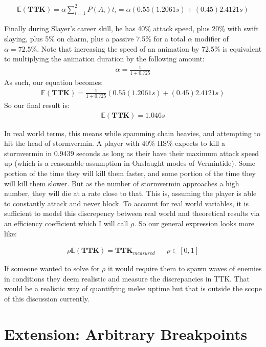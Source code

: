 \documentclass{article}
\begin{document}
\begin{align*}
\mathbb{E}(\mathbf{TTK}) = \alpha \sum_{i=1}^{2} P(A_i) t_i = \alpha (0.55 (1.2061 s) + (0.45) 2.4121 s)
\end{align*}

Finally during Slayer's career skill, he has 40\% attack speed, plus 20\% with swift slaying, plus 5\% on charm, plus a passive 7.5\% for a total $\alpha$ modifier of $\alpha=72.5\%$. Note that increasing the speed of an animation by 72.5\% is equivalent to multiplying the animation duration by the following amount:
\begin{align*}
\alpha = \frac{1}{1+0.725}
\end{align*}
As such, our equation becomes:
\begin{align*}
\mathbb{E}(\mathbf{TTK}) = \tfrac{1}{1+0.725} (0.55 (1.2061 s) + (0.45) 2.4121 s)
\end{align*}
So our final result is:
\begin{align*}
\mathbb{E}(\mathbf{TTK}) = 1.046 s
\end{align*}

In real world terms, this means while spamming chain heavies, and attempting to hit the head of stormvermin. A player with 40\% HS\% expects to kill a stormvermin in 0.9439 seconds as long as their have their maximum attack speed up (which is a reasonable assumption in Onslaught modes of Vermintide). Some portion of the time they will kill them faster, and some portion of the time they will kill them slower. But as the number of stormvermin approaches a high number, they will die at a rate close to that. This is, assuming the player is able to constantly attack and never block. To account for real world variables, it is sufficient to model this discrepency between real world and theoretical results via an efficiency coefficient which I will call $\rho$. So our general expression looks more like:

\begin{align*}
\rho \mathbb{E}(\mathbf{TTK}) = \mathbf{TTK}_{measured} && \rho \in [0,1]
\end{align*}

If someone wanted to solve for $\rho$ it would require them to spawn waves of enemies in conditions they deem realistic and measure the discrepancies in TTK. That would be a realistic way of quantifying melee uptime but that is outside the scope of this discussion currently.
\pagebreak

\section{Extension: Arbitrary Breakpoints}
\end{document}

